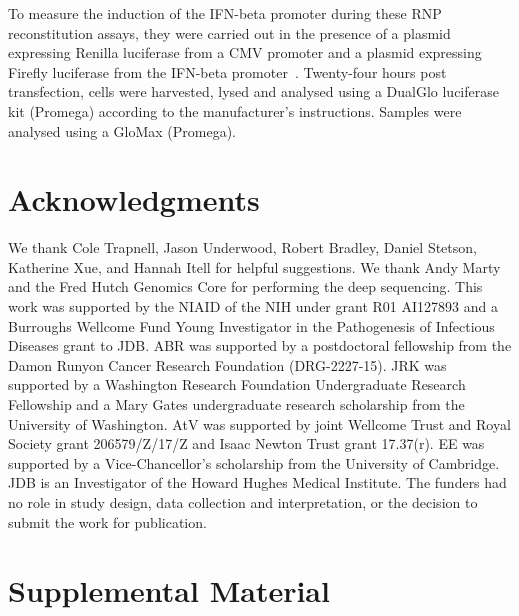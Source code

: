 \documentclass[lineno]{asm-article}
\begin{document}
To measure the induction of the IFN-beta promoter during these RNP reconstitution assays, they were carried out in the presence of a plasmid expressing Renilla luciferase from a CMV promoter and a plasmid expressing Firefly luciferase from the IFN-beta promoter~\cite{velthuis2018mini}.
Twenty-four hours post transfection, cells were harvested, lysed and analysed using a DualGlo luciferase kit (Promega) according to the manufacturer’s instructions.
Samples were analysed using a GloMax (Promega).


\normalsize

\section{Acknowledgments}
We thank Cole Trapnell, Jason Underwood, Robert Bradley, Daniel Stetson, Katherine Xue, and Hannah Itell for helpful suggestions.
We thank Andy Marty and the Fred Hutch Genomics Core for performing the deep sequencing.
This work was supported by the NIAID of the NIH under grant R01 AI127893 and a Burroughs Wellcome Fund Young Investigator in the Pathogenesis of Infectious Diseases grant to JDB.
ABR was supported by a postdoctoral fellowship from the Damon Runyon Cancer Research Foundation (DRG-2227-15).
JRK was supported by a Washington Research Foundation Undergraduate Research Fellowship and a Mary Gates undergraduate research scholarship from the University of Washington.
AtV was supported by joint Wellcome Trust and Royal Society grant 206579/Z/17/Z and Isaac Newton Trust grant 17.37(r).
EE was supported by a Vice-Chancellor's scholarship from the University of Cambridge.
JDB is an Investigator of the Howard Hughes Medical Institute.
The funders had no role in study design, data collection and interpretation, or the decision to submit the work for publication.



\clearpage
\section{Supplemental Material}
\end{document}
